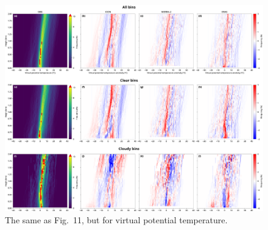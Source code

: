 \documentclass[draft,jgrga]{agutexSI2019}
\begin{document}
\begin{figure}[t]
\centerline{
\includegraphics[width=1.2\textwidth]{img/rs_thetav_hist.png}
}
\caption{
The same as Fig.~11, but for virtual potential temperature.
}
\label{fig:rs-thetav-hist}
\end{figure}
\end{document}
